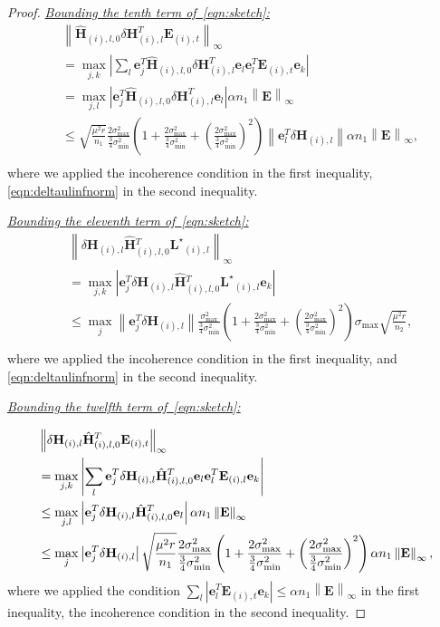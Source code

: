 \documentclass[twoside,11pt]{article}
\newcommand{\abs}[1]{\left\vert #1\right\vert}
\newcommand{\norm}[1]{\left\lVert#1\right\rVert}
\newcommand{\matE}{\mathbf{E}}
\newcommand{\hmatH}{{\hat{\mathbf{H}}}{}}
\newcommand{\matLst}{{\mathbf{L}^\star}}
\newcommand{\dtmatH}{\delta\mathbf{H}}
\newcommand{\vece}{\mathbf{e}}
\newcommand{\gop}{\sigma_{\max}}
\newcommand{\B}{\norm{\matE}_{\infty}}
\newcommand{\murnone}{\frac{\mu^2 r}{n_1}}
\newcommand{\sms}{\sigma_{\min}^2}
\newcommand{\tkappa}{\frac{2\gop^2}{\frac{3}{4}\sms}}
\newcommand{\brtkappa}{\left(\frac{2\gop^2}{\frac{3}{4}\sms}\right)}
\begin{document}
\begin{proof}
\noindent\underline{\it Bounding the tenth term of~\eqref{eqn:sketch}:}
\begin{align*}
&\norm{\hmatH_{(i),l,0}\dtmatH_{(i),l}^T\matE_{(i),t}}_{\infty}\\
&=\max_{j,k}\abs{\sum_l\vece_j^T\hmatH_{(i),l,0}\dtmatH_{(i),l}^T\vece_l\vece_l^T\matE_{(i),t}\vece_k}\\
&=\max_{j,l}\abs{\vece_j^T\hmatH_{(i),l,0}\dtmatH_{(i),l}^T\vece_l}\alpha n_1\B\\
&\le \sqrt{\frac{\mu^2 r}{n_1}}\tkappa\left(1+\tkappa+\left(\tkappa\right)^2\right)\norm{\vece_l^T\dtmatH_{(i),l}}\alpha n_1\B,\\
\end{align*}
where we applied the incoherence condition in the first inequality, \eqref{eqn:deltaulinfnorm} in the second inequality.

\noindent\underline{\it Bounding the eleventh term of~\eqref{eqn:sketch}:}
\begin{align*}
&\norm{\dtmatH_{(i),l}\hmatH_{(i),l,0}^T\matLst_{(i),l}}_{\infty}\\
&=\max_{j,k}\abs{\vece_j^T\dtmatH_{(i),l}\hmatH_{(i),l,0}^T\matLst_{(i),l}\vece_k}\\
&\le\max_{j}\norm{\vece_j^T\dtmatH_{(i),l}}\frac{\gop^2}{\frac{3}{4}\sms}\left(1+\tkappa+\brtkappa^2\right)\gop\sqrt{\frac{\mu^2 r}{n_2}},\\
\end{align*}
where we applied the incoherence condition in the first inequality, and \eqref{eqn:deltaulinfnorm} in the second inequality.

\noindent\underline{\it Bounding the twelfth term of~\eqref{eqn:sketch}:}

\begin{align}
&\norm{\dtmatH_{(i),l}\hmatH_{(i),l,0}^T\matE_{(i),t}}_{\infty}\notag\\
&=\max_{j,k}\abs{\sum_l\vece_j^T\dtmatH_{(i),l}\hmatH_{(i),l,0}^T\vece_l\vece_l^T\matE_{(i),l}\vece_k}\notag\\
&\le\max_{j,l}\abs{\vece_j^T\dtmatH_{(i),l}\hmatH_{(i),l,0}^T\vece_l}\alpha n_1\B\notag\\
&\le \max_{j}\abs{\vece_j^T\dtmatH_{(i),l}}\sqrt{\murnone}\frac{2\gop^2}{\frac{3}{4}\sms}\left(1+\tkappa+\brtkappa^2\right)\alpha n_1\B,\notag\\
\label{eqn:twelfthterm}
\end{align}
where we applied the condition $\sum_l\abs{\vece_l^T\matE_{(i),t}\vece_k}\le \alpha n_1\B$ in the first inequality, the incoherence condition in the second inequality.


\end{proof}
\end{document}

